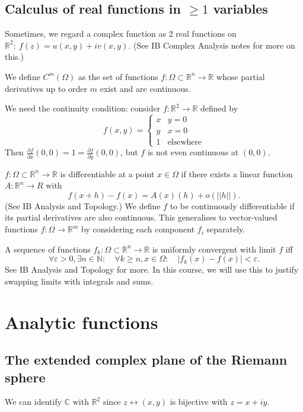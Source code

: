 \documentclass[a4paper]{scrartcl}
\begin{document}
\subsection{Calculus of real functions in $\geq 1$ variables}
Sometimes, we regard a complex function as 2 real functions on $\mathbb{R}^{2} : \ f (z)=u (x,y)+iv (x,y)$. (See IB Complex Analysis notes for more on this.)

\begin{definition}
     We define $C^{m}(\Omega)$ as the set of functions $f: \Omega \subset \mathbb{R}^{n} \rightarrow \mathbb{R}$ whose partial derivatives up to order $m$ exist and are continuous. 
\end{definition}
\begin{remark}
     We need the continuity condition: consider $f: \mathbb{R}^{2} \rightarrow \mathbb{R}$ defined by
     \begin{equation*}
        f (x,y)=
          \begin{cases}
              x & y=0\\
              y & x=0 \\
              1 & \text{elsewhere}
          \end{cases}      
     \end{equation*}
    Then $\frac{\partial f}{\partial x}(0,0)=1=\frac{\partial f}{\partial y}(0,0)$, but $f$ is not even continuous at $(0,0)$. 
\end{remark}

\begin{definition}
     $f: \Omega \subset \mathbb{R}^{n} \rightarrow \mathbb{R}$ is differentiable at a point $x \in \Omega$ if there exists a linear function $A: \mathbb{R}^{n} \rightarrow R$ with \[
     f (x+h)-f (x)=A (x)(h) +o (||h||)
     .\] (See IB Analysis and Topology.) We define $f$ to be continuously differentiable if its partial derivatives are also continuous. This generalises to vector-valued functions $f: \Omega \rightarrow \mathbb{R}^{m}$ by considering each component $f_{i}$ separately.  
\end{definition}

\begin{definition}
     A sequence of functions $f_{k}: \Omega \subset \mathbb{R}^{n} \rightarrow \mathbb{R}$ is uniformly convergent with limit $f$ iff \[
     \forall \varepsilon>0, \exists n \in \mathbb{N}: \quad  \forall k \geq n, x \in \Omega: \quad |f_{k} (x)- f (x)|< \varepsilon
     .\]
     See IB Analysis and Topology for more. In this course, we will use this to justify swapping limits with integrals and sums. 
\end{definition}

\section{Analytic functions}
\subsection{The extended complex plane of the Riemann sphere}
We can identify $\mathbb{C}$ with $\mathbb{R}^2$ since $z \leftrightarrow (x,y)$ is bijective with $z=x+iy$.
\end{document}
